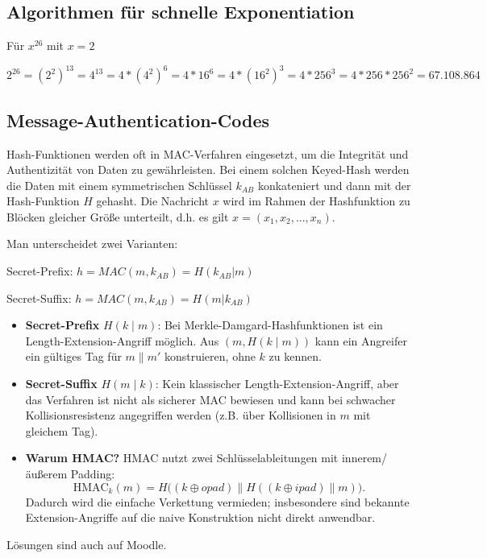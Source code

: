 \documentclass[a4paper]{article}
\begin{document}

\subsection{Algorithmen für schnelle Exponentiation}

Für $x^{26}$ mit $x=2$

\[
2^{26} = (2^2)^{13} = 4^{13} = 4 * (4^2)^6  = 4 * 16^6 = 4 * (16^2)^3 = 4 * 256^3 = 4 * 256 * 256^2 = 67.108.864
\]

\subsection{Message-Authentication-Codes}

Hash-Funktionen werden oft in MAC-Verfahren eingesetzt, um die Integrität und Authentizität von Daten zu gewährleisten. Bei einem solchen Keyed-Hash werden die Daten mit einem symmetrischen Schlüssel $k_{AB}$ konkateniert und dann mit der Hash-Funktion $H$ gehasht. Die Nachricht $x$ wird im Rahmen der Hashfunktion zu Blöcken gleicher Größe unterteilt, d.h. es gilt $x = (x_1, x_2, ..., x_n)$.

Man unterscheidet zwei Varianten:

Secret-Prefix: $h = MAC(m, k_{AB}) = H(k_{AB} | m)$

Secret-Suffix: $h = MAC(m, k_{AB}) = H( m | k_{AB})$

\begin{itemize}
    \item \textbf{Secret-Prefix} $H(k\mid m)$: Bei Merkle-Damgard-Hashfunktionen ist ein Length-Extension-Angriff möglich. Aus $(m, H(k\mid m))$ kann ein Angreifer ein gültiges Tag für $m\parallel m'$ konstruieren, ohne $k$ zu kennen.
    \item \textbf{Secret-Suffix} $H(m\mid k)$: Kein klassischer Length-Extension-Angriff, aber das Verfahren ist nicht als sicherer MAC bewiesen und kann bei schwacher Kollisionsresistenz angegriffen werden (z.B. über Kollisionen in $m$ mit gleichem Tag).
    \item \textbf{Warum HMAC?} HMAC nutzt zwei Schlüsselableitungen mit innerem/äußerem Padding:
    $$\mathrm{HMAC}_k(m)=H\big((k\oplus opad)\parallel H((k\oplus ipad)\parallel m)\big).$$
    Dadurch wird die einfache Verkettung vermieden; insbesondere sind bekannte Extension-Angriffe auf die naive Konstruktion nicht direkt anwendbar.
\end{itemize}

Lösungen sind auch auf Moodle.
\end{document}
